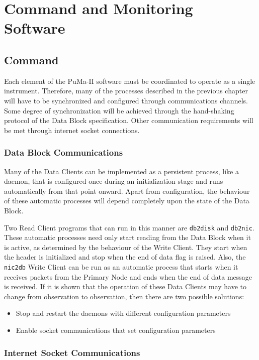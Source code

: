 \chapter{Command and Monitoring Software}

\section{Command}

Each element of the PuMa-II software must be coordinated to operate as
a single instrument.  Therefore, many of the processes described in
the previous chapter will have to be synchronized and configured
through communications channels.  Some degree of synchronization will
be achieved through the hand-shaking protocol of the Data Block
specification.  Other communication requirements will be met through
internet socket connections.

\subsection{Data Block Communications}

Many of the Data Clients can be implemented as a persistent process,
like a daemon, that is configured once during an initialization stage
and runs automatically from that point onward.  Apart from
configuration, the behaviour of these automatic processes will depend
completely upon the state of the Data Block.

Two Read Client programs that can run in this manner are {\tt db2disk}
and {\tt db2nic}.  These automatic processes need only start reading
from the Data Block when it is active, as determined by the behaviour
of the Write Client.  They start when the header is initialized and
stop when the end of data flag is raised.
Also, the {\tt nic2db} Write Client can be run as an automatic process
that starts when it receives packets from the Primary Node and ends
when the end of data message is received.
If it is shown that the operation of these Data Clients may have to
change from observation to observation, then there are two possible
solutions:
\begin{itemize}
\item Stop and restart the daemons with different configuration parameters
\item Enable socket communications that set configuration parameters
\end{itemize}

\subsection{Internet Socket Communications}

